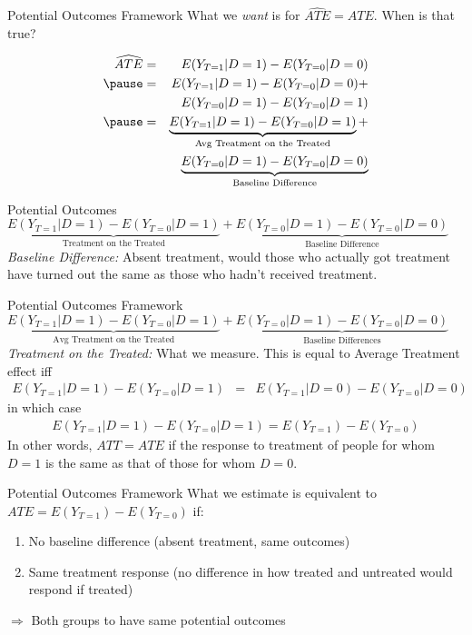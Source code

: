\documentclass[11pt]{beamer}
\begin{document}
\begin{frame}[c]{Potential Outcomes Framework}
What we \emph{want} is for $\widehat{ATE} = ATE$. When is that true?

  \begin{eqnarray}
  \widehat{ATE} &=&E(Y_{T=1}|D=1) - E(Y_{T=0}|D=0) \nonumber \\
                \pause &=&E(Y_{T=1}|D=1) - E(Y_{T=0}|D=0) + \nonumber \\
                &&E(Y_{T=0}|D=1) - E(Y_{T=0}|D=1)  \nonumber \\
               \pause &=& \underbrace{E(Y_{T=1}|D=1) - E(Y_{T=0}|D=1)}_{\text{Avg Treatment on the Treated}} + \nonumber \\ &&\underbrace{E(Y_{T=0}|D=1) - E(Y_{T=0}|D=0)}_{\text{Baseline Difference}} \nonumber
  \end{eqnarray}
\end{frame}

\begin{frame}[c]{Potential Outcomes}
$\underbrace{E(Y_{T=1}|D=1) - E(Y_{T=0}|D=1)}_{\text{Treatment on the Treated}} + \underbrace{E(Y_{T=0}|D=1) - E(Y_{T=0}|D=0)}_{\text{Baseline Difference}}$ \\
\vspace*{1cm}
\emph{Baseline Difference:} Absent treatment, would those who actually got treatment have turned out the same as those who hadn't received treatment.
\end{frame}

\begin{frame}[c]{Potential Outcomes Framework}
$\underbrace{E(Y_{T=1}|D=1) - E(Y_{T=0}|D=1)}_{\text{Avg Treatment on the Treated}} + \underbrace{E(Y_{T=0}|D=1) - E(Y_{T=0}|D=0)}_{\text{Baseline Differences}}$ \\
\vspace*{1cm}
\emph{Treatment on the Treated:} What we measure. This is equal to Average Treatment effect iff
\begin{eqnarray}
E(Y_{T=1}|D=1) - E(Y_{T=0}|D=1) &=& E(Y_{T=1}|D=0) - E(Y_{T=0}|D=0)\nonumber
\end{eqnarray}
in which case 
\begin{eqnarray}
E(Y_{T=1}|D=1) - E(Y_{T=0}|D=1) = E(Y_{T=1}) - E(Y_{T=0})
\end{eqnarray}
In other words, $ATT = ATE$ if the response to treatment of people for whom $D=1$ is the same as that of those for whom $D=0$.
\end{frame}

\begin{frame}[c]{Potential Outcomes Framework}
What we estimate is equivalent to $ATE = E(Y_{T=1}) - E(Y_{T=0})$ if:

\begin{enumerate}
  \item No baseline difference (absent treatment, same outcomes)
  \item Same treatment response (no difference in how treated and untreated would respond if treated)
\end{enumerate}
$\Rightarrow$ Both groups to have \alert{same potential outcomes}
\end{frame}
\end{document}
